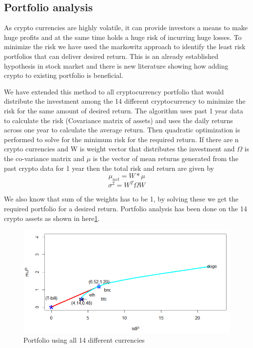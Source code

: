 \documentclass[final]{cvpr}
\begin{document}
\subsection{Portfolio analysis}

As crypto currencies are highly volatile, it can provide investors a means to make huge profits and at the same time holds a huge risk of incurring huge losses. To minimize the risk we have used the markowitz approach to identify the least risk portfolios that can deliver desired return. This is an already established hypothesis in stock market and there is new literature showing how adding crypto to existing portfolio is beneficial.~\cite{portfolio}

We have extended this method to all cryptocurrency portfolio that would distribute the investment among the 14 different cryptocurrency to minimize the risk for the same amount of desired return. The algorithm uses past 1 year data to calculate the risk (Covariance matrix of assets) and uses the daily returns across one year to calculate the average return. Then quadratic optimization is performed to solve for the minimum risk for the required return. If there are n crypto currencies and W is weight vector that distributes the investment and $\Omega$ is the co-variance matrix and $\mu$ is the vector of mean returns  generated from the past crypto data for 1 year then the total risk and return are given by $$\mu_{net} = W*\mu$$ $$\sigma^2 = W^T\Omega W $$

We also know that sum of the weights has to be 1, by solving these we get the required portfolio for a desired return. Portfolio analysis has been done on the 14 crypto assets as shown in here\ref{fig:port}. 

\begin{figure}[h!]
\begin{center}
\caption{Portfolio using all 14 different currencies}
\includegraphics[width=0.8\linewidth]{latex/portfolio.PNG}
\end{center}
\label{fig:port}
\end{figure}
\end{document}
